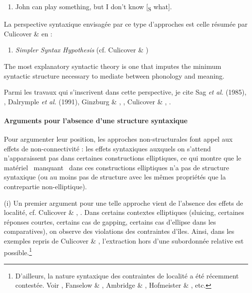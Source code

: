 \begin{enumerate}
\item \label{bkm:Ref305957345}John can play something, but I don't know [\textsubscript{S} what].  


\end{enumerate}
La perspective syntaxique envisagée par ce type d'approches est celle résumée par Culicover \& \citet{Jackendoff2005} en  :  


\begin{enumerate}
\item \label{bkm:Ref305957581}\textit{Simpler Syntax Hypothesis} (cf. Culicover \& \citet[5]{Jackendoff2005})


\end{enumerate}
The most explanatory syntactic theory is one that imputes the minimum syntactic structure necessary to mediate between phonology and meaning.  

Parmi les travaux qui s'inscrivent dans cette perspective, je cite Sag \textit{et al.} (1985), \citet{Gardent1991}, Dalrymple \textit{et al.} (1991), Ginzburg \& \citet{Sag2000}, \citet{Schlangen2003}, Culicover \& \citet{Jackendoff2005}, \citet{Stainton2006}.

\paragraph[Arguments pour l'absence d'une structure syntaxique]{Arguments pour l'absence d'une structure syntaxique}
Pour argumenter leur position, les approches non-structurales font appel aux effets de non-connectivité : les effets syntaxiques auxquels on s'attend n'apparaissent pas dans certaines constructions elliptiques, ce qui montre que le matériel {\guillemotleft}~manquant~{\guillemotright} dans ces constructions elliptiques n'a pas de structure syntaxique (ou au moins pas de structure avec les mêmes propriétés que la contrepartie non-elliptique).

(i) Un premier argument pour une telle approche vient de l'absence des effets de localité, cf. Culicover \& \citet{Jackendoff2005}, \citet{Stainton2006}. Dans certains contextes elliptiques (sluicing, certaines réponses courtes, certains cas de gapping, certains cas d'ellipse dans les comparatives), on observe des violations des contraintes d'îles. Ainsi, dans les exemples  repris de Culicover \& \citet{Jackendoff2005}, l'extraction hors d'une subordonnée relative est possible.\footnote{D'ailleurs, la nature syntaxique des contraintes de localité a été récemment contestée. Voir \citet{Kluender1998}, Fanselow \& \citet{Frisch2006}, Ambridge \& \citet{Goldberg2008}, Hofmeister \& \citet{Sag2010}, etc.}


